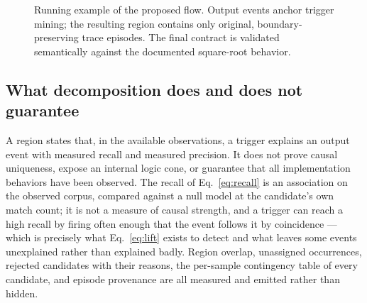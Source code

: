 \begin{figure}[t]
\centering
{}
\caption{Running example of the proposed flow. Output events anchor trigger mining; the
resulting region contains only original, boundary-preserving trace episodes. The final
contract is validated semantically against the documented square-root behavior.}
\label{fig:example}
\end{figure}

\subsection{What decomposition does and does not guarantee}
A region states that, in the available observations, a trigger explains an output event with
measured recall and measured precision. It does not prove causal uniqueness, expose an
internal logic cone, or guarantee that all implementation behaviors have been observed. The
recall of Eq.~\ref{eq:recall} is an association on the observed corpus, compared against a
null model at the candidate's own match count; it is not a measure of causal strength, and a
trigger can reach a high recall by firing often enough that the event follows it by
coincidence --- which is precisely what Eq.~\ref{eq:lift} exists to detect and what leaves
some events unexplained rather than explained badly. Region overlap, unassigned occurrences,
rejected candidates with their reasons, the per-sample contingency table of every candidate,
and episode provenance are all measured and emitted rather than hidden.
